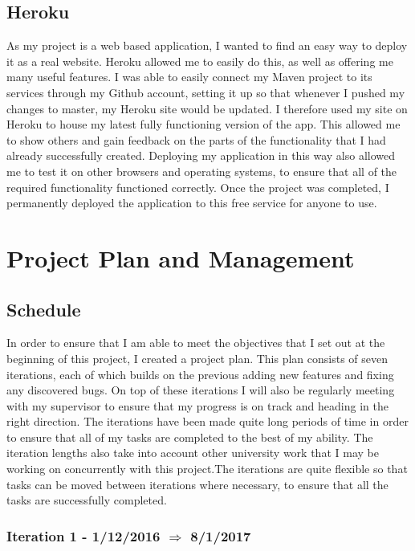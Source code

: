 \subsection{Heroku\label{heroku}}
As my project is a web based application, I wanted to find an easy way to deploy it as a real website. Heroku allowed me to easily do this, as well as offering me many useful features. I was able to easily connect my Maven project to its services through my Github account, setting it up so that whenever I pushed my changes to master, my Heroku site would be updated. I therefore used my site on Heroku to house my latest fully functioning version of the app. This allowed me to show others and gain feedback on the parts of the functionality that I had already successfully created. Deploying my application in this way also allowed me to test it on other browsers and operating systems, to ensure that all of the required functionality functioned correctly. Once the project was completed, I permanently deployed the application to this free service for anyone to use.


\section{Project Plan and Management}

\subsection{Schedule}

In order to ensure that I am able to meet the objectives that I set out at the beginning of this project, I created a project plan. This plan consists of seven iterations, each of which builds on the previous adding new features and fixing any discovered bugs. On top of these iterations I will also be regularly meeting with my supervisor to ensure that my progress is on track and heading in the right direction. The iterations have been made quite long periods of time in order to ensure that all of my tasks are completed to the best of my ability. The iteration lengths also take into account other university work that I may be working on concurrently with this project.The iterations are quite flexible so that tasks can be moved between iterations where necessary, to ensure that all the tasks are successfully completed. 


\subsubsection{Iteration 1 - 1/12/2016 $\Rightarrow$ 8/1/2017}

